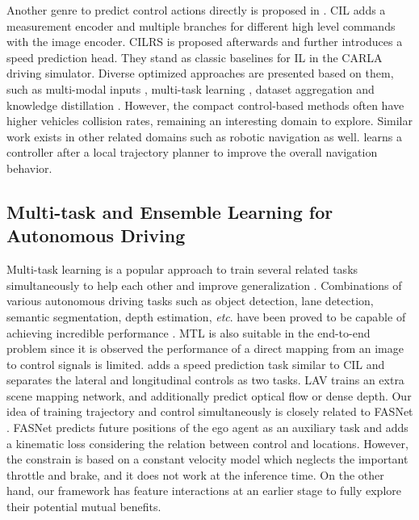 \documentclass{article}
\begin{document}
Another genre to  predict control actions directly is 
proposed in \citep{pomerleau1988alvinn, muller2005e2eavoid, bojarski2016nvend, xu2017lstme2e}. CIL \citep{codevilla2018cil} adds a measurement encoder and multiple branches for different high level commands with the image encoder.
CILRS \citep{codevilla2019cilrs} is proposed afterwards and further introduces a speed prediction head. They stand as classic baselines for IL in the CARLA driving simulator. Diverse optimized approaches are presented based on them, such as multi-modal inputs \citep{hawke2020urbancil, xiao2020multimodal}, multi-task learning \citep{yang2018e2emmmt, li2018rethinking, hou2019fmnet, ishihara2021multie2eattention, kim2020fasnet, huch2021e2ecav, zhu2022mtcil}, dataset aggregation \citep{prakash2020darb} and knowledge distillation \citep{zhao2021sam, zhang2021roach}.
However, the compact control-based methods often have higher vehicles collision rates, remaining an interesting domain to explore.
Similar work exists in other related domains such as robotic navigation as well. \citep{pokle2019robot} learns a controller after a local trajectory planner to improve the overall navigation behavior.


\subsection{Multi-task and Ensemble Learning for Autonomous Driving}






Multi-task learning is a popular approach to train several related tasks simultaneously to help each other and improve generalization \citep{caruana1997mtl, argyriou2006mtfl}. Combinations of various autonomous driving tasks such as object detection, lane detection, semantic segmentation, depth estimation, \textit{etc}. have been proved to be capable of achieving incredible performance \citep{liang2019multi3d, chennupati2019multinet++, rajamanoharan2019mtmlreid, kumar2021omnidet, wu2021yolop, chen2022persformer}.
MTL is also suitable in the end-to-end problem since it is observed the performance of a direct mapping from an image to control signals is limited.
\citep{yang2018e2emmmt} adds a speed prediction task similar to CIL \citep{codevilla2018cil} and \citep{zhu2022mtcil} separates the lateral and longitudinal controls as two tasks. LAV \citep{chen2022lav} trains an extra scene mapping network, and \citep{hou2019fmnet, ishihara2021multie2eattention, jaeger2021transfuser+} additionally predict optical flow or dense depth.
Our idea of training trajectory and control simultaneously is closely related to FASNet \citep{kim2020fasnet}. FASNet predicts future positions of the ego agent as an auxiliary task and adds a kinematic loss considering the relation between control and locations. However, the constrain is based on a constant velocity model which neglects the important throttle and brake, and it does not work at the inference time. On the other hand, our \algname framework has feature interactions at an earlier stage to fully explore their potential mutual benefits.
\end{document}
